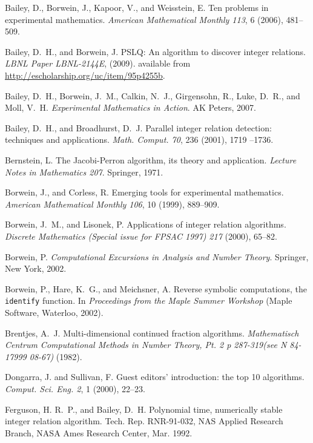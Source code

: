 \documentclass{sig-alternate}
\numberwithin{theorem}{section} \numberwithin{equation}{section}
\begin{document}
\begin{thebibliography}{10}

{\sc Bailey, D., Borwein, J., Kapoor, V., and Weisstein, E.}  {Ten
problems in experimental mathematics}. {\em American Mathematical
Monthly 113}, 6 (2006), 481--509.

{\sc Bailey, D.~H., and Borwein, J.}
  PSLQ: An algorithm to discover integer relations.
  {\em LBNL Paper LBNL-2144E}, (2009). available from  \url{http://escholarship.org/uc/item/95p4255b}.

{\sc Bailey, D.~H., Borwein, J.~M., Calkin, N.~J., Girgensohn, R.,
Luke, D.~R., and Moll, V.~H.}
  {\em Experimental Mathematics in Action}.
  AK Peters, 2007.

{\sc Bailey, D.~H., and Broadhurst, D.~J.} Parallel integer relation
detection: techniques and applications. {\em Math. Comput. 70}, 236
(2001), 1719 --1736.

{\sc Bernstein, L.}
  The Jacobi-Perron algorithm, its theory and application.
  {\em Lecture Notes in Mathematics 207}. Springer, 1971.

{\sc Borwein, J., and Corless, R.}
  {Emerging tools for experimental mathematics}.
  {\em American Mathematical Monthly 106}, 10 (1999), 889--909.

{\sc Borwein, J.~M., and Lisonek, P.}
  Applications of integer relation algorithms.
  {\em Discrete Mathematics (Special issue for FPSAC 1997) 217\/}
  (2000), 65--82.

{\sc Borwein, P.}
  {\em Computational Excursions in Analysis and Number Theory}.
  Springer, New York, 2002.

{\sc Borwein, P., Hare, K.~G., and Meichsner, A.}
  Reverse symbolic computations, the {\tt identify} function.
  In {\em Proceedings from the Maple Summer Workshop\/} (Maple
  Software, Waterloo, 2002).

{\sc Brentjes, A.~J.}
  Multi-dimensional continued fraction algorithms.
  {\em Mathematisch Centrum Computational Methods in Number Theory, Pt.
  2 p 287-319(see N 84-17999 08-67)\/} (1982).



{\sc Dongarra, J. and Sullivan, F.}
 Guest editors' introduction: the top 10 algorithms.
  {\em Comput. Sci. Eng. 2}, 1 (2000), 22--23.

{\sc Ferguson, H. R.~P., and Bailey, D.~H.}
  Polynomial time, numerically stable integer relation algorithm.
  Tech. Rep. RNR-91-032, NAS Applied Research Branch, NASA Ames
  Research Center, Mar. 1992.


\end{thebibliography}
\end{document}
